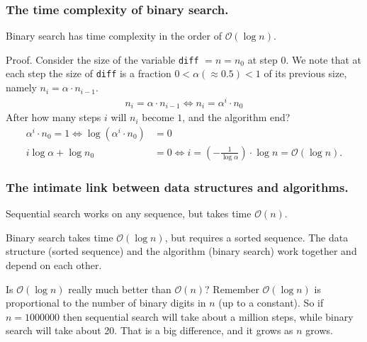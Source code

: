 \documentclass{beamer} %
\begin{document}
\begin{frame}
\frametitle{The time complexity of binary search.}

\begin{block}{}
Binary search has time complexity in the order of $\mathcal{O}(\log n)$.
\end{block}

\vspace{3mm}
Proof. Consider the size of the variable \texttt{diff} $=n =n_0$ at step 0. We note that at each step the size of \texttt{diff} is a fraction $0 < \alpha (\approx 0.5) < 1$ of its previous size, namely $n_i = \alpha \cdot n_{i-1}$.
\begin{align}
n_i = \alpha \cdot n_{i-1} \Leftrightarrow n_i = \alpha^i \cdot n_{0}
\end{align}
After how many steps $i$ will $n_i$ become $1$, and the algorithm end?
\begin{align}
\alpha^i \cdot n_{0} = 1 \Leftrightarrow \log (\alpha^i \cdot n_{0}) &= 0 \\
i \log \alpha + \log n_{0} &= 0 \Leftrightarrow i = \left( - \frac{1}{\log \alpha} \right) \cdot \log n = \mathcal{O}(\log n).
\end{align}

\end{frame}


\begin{frame}
\frametitle{The intimate link between data structures and algorithms.}

Sequential search works on any sequence, but takes time $\mathcal{O}(n)$.

\vspace{5mm}
Binary search takes time $\mathcal{O}(\log n)$, but requires a sorted sequence. The data structure (sorted sequence) and the algorithm (binary search) work together and depend on each other.

\vspace{5mm}
\begin{block}{Is $\mathcal{O}(\log n)$ really much better than $\mathcal{O}(n)$?}
Remember $\mathcal{O}(\log n)$ is proportional to the number of binary digits in $n$ (up to a constant). So if $n=1000000$ then sequential search will take about a million steps, while binary search will take about 20. That is a big difference, and it grows as $n$ grows.
\end{block}

\end{frame}
\end{document}
